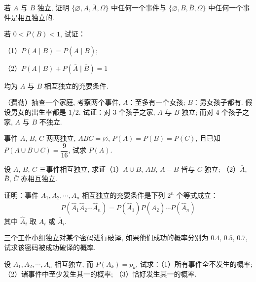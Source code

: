 \documentclass[../../main.tex]{subfiles}
\begin{document}
\begin{exercise}\label{exercise:ch02-14}
若 $A$ 与 $B$ 独立, 证明 $\{\varnothing, A, \bar{A}, \Omega\}$ 中任何一个事件与 $\{\varnothing, B, \bar{B}, \Omega\}$ 中任何一个事件是相互独立的.
\end{exercise}

\begin{exercise}\label{exercise:ch02-15}
若 $0<P(B)<1$, 试证：

（1）$P(A\mid B)=P(A\mid\bar{B})$;

（2）$P(A\mid B)+P(\bar{A}\mid\bar{B})=1$

均为 $A$ 与 $B$ 相互独立的充要条件.
\end{exercise}

\begin{exercise}\label{exercise:ch02-16}
（费勒）抽查一个家庭, 考察两个事件, $A$：至多有一个女孩; $B$：男女孩子都有. 假设男女的出生率都是 $1/2$. 试证：对 3 个孩子之家, $A$ 与 $B$ 独立; 而对 4 个孩子之家, $A$ 与 $B$ 不独立.
\end{exercise}

\begin{exercise}\label{exercise:ch02-17}
事件 $A$, $B$, $C$ 两两独立, $ABC=\varnothing$, $P(A)=P(B)=P(C)$, 且已知 $P(A\cup B\cup C)=\dfrac{9}{16}$, 试求 $P(A)$.
\end{exercise}

\begin{exercise}\label{exercise:ch02-18}
设 $A$, $B$, $C$ 三事件相互独立, 求证（1）$A\cup B$, $AB$, $A-B$ 皆与 $C$ 独立; （2）$\bar{A}$, $\bar{B}$, $\bar{C}$ 亦相互独立.
\end{exercise}

\begin{exercise}\label{exercise:ch02-19}
证明：事件 $A_1, A_2, \cdots, A_n$ 相互独立的充要条件是下列 $2^n$ 个等式成立：
\begin{align*}
P(\hat{A}_1\hat{A}_2\cdots\hat{A}_n)=P(\hat{A}_1)P(\hat{A}_2)\cdots P(\hat{A}_n)
\end{align*}
其中 $\hat{A}_i$ 取 $A_i$ 或 $\bar{A}_i$.
\end{exercise}

\begin{exercise}\label{exercise:ch02-20}
三个工作小组独立对某个密码进行破译, 如果他们成功的概率分别为 $0.4$, $0.5$, $0.7$, 试求该密码被成功破译的概率.
\end{exercise}

\begin{exercise}\label{exercise:ch02-21}
设 $A_1, A_2, \cdots, A_n$ 相互独立, 而 $P(A_k)=p_k$, 试求：（1）所有事件全不发生的概率; （2）诸事件中至少发生其一的概率; （3）恰好发生其一的概率.
\end{exercise}
\end{document}
